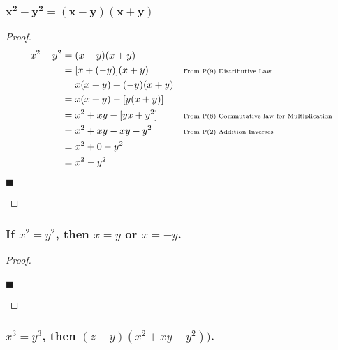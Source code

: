 \documentclass[letterpaper, 10 pt, conference]{ieeeconf}  %
\begin{document}
\begin{mdframed}
\subsubsection{$\boldsymbol{x^2 - y^2 = (x - y)(x + y)}$}
\end{mdframed}

\begin{proof}
\begin{align}
     x^2 - y^2&= (x - y)(x + y) && \\
     &=[x + (-y)](x + y) && \text{\tiny{From P(9) Distributive Law}} \\ 
     &=x(x + y) + (-y)(x +y) &&\\
     &=x(x + y) - [y(x +y)] &&\\
     &=x^2 + xy - [yx + y^2] && \text{\tiny{From P(8) Commutative law for Multiplication}}\\
     &=x^2 + xy - xy - y^2 && \text{\tiny{From P(2) Addition Inverses}}\\
     &=x^2 + 0 - y^2 &&\\
     &=x^2 - y^2 &&
\end{align}
\begin{flushright}
$\blacksquare$
\end{flushright}
\end{proof}

\begin{mdframed}
\subsubsection{\textbf{If $x^2 = y^2$, then $x = y$ or $x = -y$.}}

\end{mdframed}

\begin{proof}
\begin{align}
    
\end{align}
\begin{flushright}
$\blacksquare$
\end{flushright}
\end{proof}

\begin{mdframed}
\subsubsection{\textbf{$x^3 = y^3$, then $(z - y)(x^2 + xy +y^2))$.}}
\end{mdframed}
\end{document}
